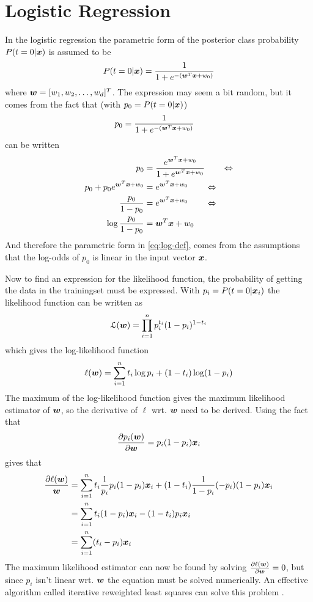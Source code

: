 \section{Logistic Regression}
In the logistic regression the parametric form of the posterior class probability $P(t=0|\boldsymbol{x})$ is assumed to be
\begin{equation}\label{eq:log-def}
    P(t=0|\boldsymbol{x}) = \frac{1}{1+e^{-(\boldsymbol{w}^T\boldsymbol{x}+w_0)}}
\end{equation}
where $\boldsymbol{w}=[w_1, w_2, \dots, w_d]^T$. The expression may seem a bit random, but it comes from the fact that (with $p_0=P(t=0|\boldsymbol{x})$)
\begin{align*}
    p_0 &= \frac{1}{1+e^{-(\boldsymbol{w}^T\boldsymbol{x}+w_0)}} 
\end{align*}
can be written
\begin{align*}
    p_0 &= \frac{e^{\boldsymbol{w}^T\boldsymbol{x}+w_0}}{1+e^{\boldsymbol{w}^T\boldsymbol{x}+w_0}} \quad\quad\Leftrightarrow \\
    p_0 + p_0e^{\boldsymbol{w}^T\boldsymbol{x}+w_0} &= e^{\boldsymbol{w}^T\boldsymbol{x}+w_0} \quad\quad\Leftrightarrow \\
    \frac{p_0}{1-p_0} &= e^{\boldsymbol{w}^T\boldsymbol{x}+w_0} \quad\quad\Leftrightarrow \\
    \log \frac{p_0}{1-p_0} &= \boldsymbol{w}^T\boldsymbol{x}+w_0
\end{align*}
And therefore the parametric form in \eqref{eq:log-def}, comes from the assumptions that the log-odds of $p_0$ is linear in the input vector $\boldsymbol{x}$. \par
Now to find an expression for the likelihood function, the probability of getting the data in the trainingset must be expressed. With $p_i=P(t=0|\boldsymbol{x}_i)$ the likelihood function can be written as
\[
    \mathcal{L}(\boldsymbol{w}) = \prod_{i=1}^n p_i^{t_i}(1-p_i)^{1-t_i}
\]
which gives the log-likelihood function
\[
    \ell(\boldsymbol{w}) = \sum_{i=1}^n t_i\log p_i + (1-t_i)\log(1-p_i)
\]
The maximum of the log-likelihood function gives the maximum likelihood estimator of $\boldsymbol{w}$, so the derivative of $\ell$ wrt. $\boldsymbol{w}$ need to be derived. Using the fact that
\[
    \frac{\partial p_i(\boldsymbol{w})}{\partial \boldsymbol{w}} = p_i(1-p_i)\boldsymbol{x}_i
\]
gives that
\begin{align*}
    \frac{\partial \ell(\boldsymbol{w})}{\boldsymbol{w}} &= \sum_{i=1}^n t_i \frac{1}{p_i}p_i(1-p_i)\boldsymbol{x}_i + (1-t_i)\frac{1}{1-p_i}(-p_i)(1-p_i)\boldsymbol{x}_i \\
    &= \sum_{i=1}^n t_i(1-p_i)\boldsymbol{x}_i - (1-t_i)p_i\boldsymbol{x}_i \\
    &= \sum_{i=1}^n (t_i-p_i)\boldsymbol{x}_i
\end{align*}
The maximum likelihood estimator can now be found by solving $\frac{\partial\ell(\boldsymbol{w})}{\partial\boldsymbol{w}}=0$, but since $p_i$ isn't linear wrt. $\boldsymbol{w}$ the equation must be solved numerically. An effective algorithm called iterative reweighted least squares can solve this problem \citep[p.207]{bishop}.

